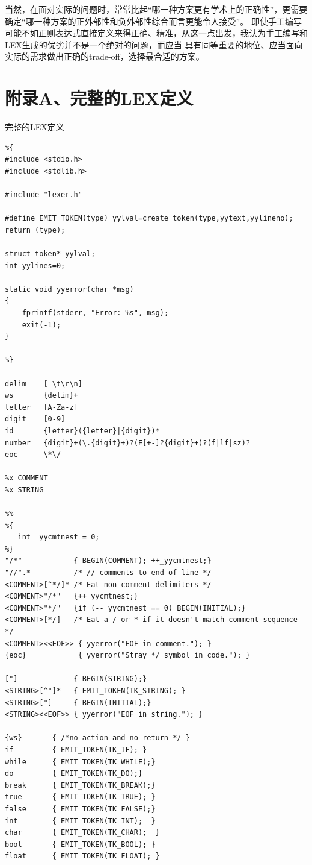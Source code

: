 \documentclass[a4paper,twoside]{article}
\newenvironment{longlisting}{\captionsetup{type=figure}}{}
\begin{document}
\begin{spacing}{1.2}
当然，在面对实际的问题时，常常比起“哪一种方案更有学术上的正确性”，更需要确定“哪一种方案的正外部性和负外部性综合而言更能令人接受”。
即使手工编写可能不如正则表达式直接定义来得正确、精准，从这一点出发，我认为手工编写和LEX生成的优劣并不是一个绝对的问题，而应当
具有同等重要的地位、应当面向实际的需求做出正确的trade-off，选择最合适的方案。



\clearpage
\appendix
\section{附录A、完整的LEX定义}
\begin{longlisting}
	\caption{完整的LEX定义}
	\label{code:fullcode}
	\begin{verbatim}
%{
#include <stdio.h>
#include <stdlib.h>

#include "lexer.h"

#define EMIT_TOKEN(type) yylval=create_token(type,yytext,yylineno); return (type);

struct token* yylval;
int yylines=0;

static void yyerror(char *msg)
{
    fprintf(stderr, "Error: %s", msg);
    exit(-1);
}

%}

delim    [ \t\r\n]
ws       {delim}+
letter   [A-Za-z]
digit    [0-9]
id       {letter}({letter}|{digit})*
number   {digit}+(\.{digit}+)?(E[+-]?{digit}+)?(f|lf|sz)?
eoc      \*\/

%x COMMENT
%x STRING

%%
%{
   int _yycmtnest = 0;
%}
"/*"            { BEGIN(COMMENT); ++_yycmtnest;}
"//".*          /* // comments to end of line */
<COMMENT>[^*/]* /* Eat non-comment delimiters */
<COMMENT>"/*"   {++_yycmtnest;}
<COMMENT>"*/"   {if (--_yycmtnest == 0) BEGIN(INITIAL);}
<COMMENT>[*/]   /* Eat a / or * if it doesn't match comment sequence */
<COMMENT><<EOF>> { yyerror("EOF in comment."); }
{eoc}            { yyerror("Stray */ symbol in code."); }

["]             { BEGIN(STRING);}
<STRING>[^"]*   { EMIT_TOKEN(TK_STRING); }
<STRING>["]     { BEGIN(INITIAL);}
<STRING><<EOF>> { yyerror("EOF in string."); }

{ws}       { /*no action and no return */ }
if         { EMIT_TOKEN(TK_IF); }
while      { EMIT_TOKEN(TK_WHILE);}
do         { EMIT_TOKEN(TK_DO);}
break      { EMIT_TOKEN(TK_BREAK);}
true       { EMIT_TOKEN(TK_TRUE); }
false      { EMIT_TOKEN(TK_FALSE);}
int        { EMIT_TOKEN(TK_INT);  }
char       { EMIT_TOKEN(TK_CHAR);  }
bool       { EMIT_TOKEN(TK_BOOL); }
float      { EMIT_TOKEN(TK_FLOAT); }


\end{verbatim}
\end{longlisting}
\end{spacing}
\end{document}
